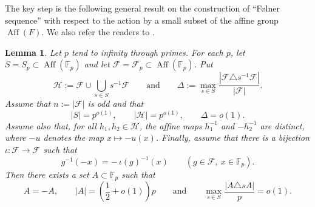 \documentclass[11pt,letterpaper,reqno]{amsart}
\newtheorem{lemma}[theorem]{Lemma}
\theoremstyle{definition}
\newcommand{\F}{\mathbb F}
\newcommand{\1}{\mathbf 1}
\DeclareMathOperator{\Aff}{Aff}
\begin{document}
The key step is the following general result on the construction of ``F\o lner sequence'' with respect to the action by a small subset of the affine group $\Aff(F)$. We also refer the readers to \cite{MOQ, MOA}. 
\begin{lemma}\label{lem:folner-majority}
Let $p$ tend to infinity through primes.  For each $p$, let
$S=S_p\subset\Aff(\F_p)$ and let
$\mathcal F=\mathcal F_p\subset\Aff(\F_p)$.  Put
\[ 
        \mathcal H:=\mathcal F\cup\bigcup_{s\in S}s^{-1}\mathcal F \qquad \text{and} \qquad \Delta:=\max_{s\in S}
        \frac{|\mathcal F\triangle s^{-1}\mathcal F|}{|\mathcal F|}.
\]
Assume that $  n:=|\mathcal F|$ is odd and that
\[
        |S|=p^{o(1)},\qquad |\mathcal H|=p^{o(1)},\qquad \Delta=o(1).
\]
Assume also that, for all $h_1,h_2\in\mathcal H$, the affine maps
$h_1^{-1}$ and $-h_2^{-1}$ are distinct, where $-u$ denotes the map
$x\mapsto -u(x)$.  Finally, assume that there is a bijection
$\iota:\mathcal F\to\mathcal F$ such that
\[
        g^{-1}(-x)=-\,\iota(g)^{-1}(x)
        \qquad (g\in\mathcal F,\ x\in\F_p).
\]
Then there exists a set $A\subset\F_p$ such that
\[
        A=-A,\qquad |A|=\left(\frac12+o(1)\right)p \qquad \text{and} \qquad \max_{s\in S}\frac{|A\triangle sA|}{p}=o(1).
\]
\end{lemma}
\end{document}
